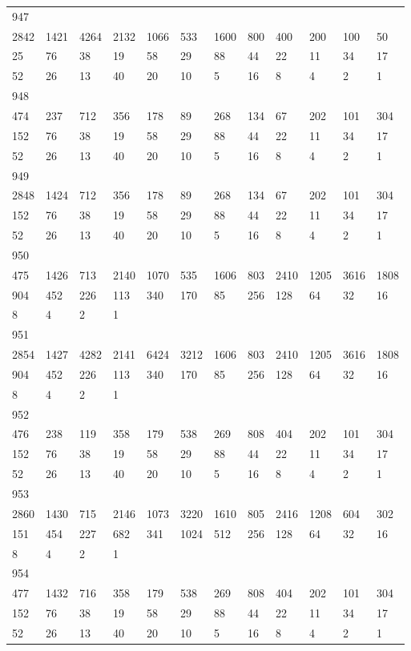 \begin{longtable}{llllllllllll}
947&&&&&&&&&&&\\
2842& 1421& 4264& 2132& 1066& 533& 1600& 800& 400& 200& 100& 50\\
25& 76& 38& 19& 58& 29& 88& 44& 22& 11& 34& 17\\
52& 26& 13& 40& 20& 10& 5& 16& 8& 4& 2& 1\\

948&&&&&&&&&&&\\
474& 237& 712& 356& 178& 89& 268& 134& 67& 202& 101& 304\\
152& 76& 38& 19& 58& 29& 88& 44& 22& 11& 34& 17\\
52& 26& 13& 40& 20& 10& 5& 16& 8& 4& 2& 1\\

949&&&&&&&&&&&\\
2848& 1424& 712& 356& 178& 89& 268& 134& 67& 202& 101& 304\\
152& 76& 38& 19& 58& 29& 88& 44& 22& 11& 34& 17\\
52& 26& 13& 40& 20& 10& 5& 16& 8& 4& 2& 1\\

950&&&&&&&&&&&\\
475& 1426& 713& 2140& 1070& 535& 1606& 803& 2410& 1205& 3616& 1808\\
904& 452& 226& 113& 340& 170& 85& 256& 128& 64& 32& 16\\
8& 4& 2& 1& \\

951&&&&&&&&&&&\\
2854& 1427& 4282& 2141& 6424& 3212& 1606& 803& 2410& 1205& 3616& 1808\\
904& 452& 226& 113& 340& 170& 85& 256& 128& 64& 32& 16\\
8& 4& 2& 1& \\

952&&&&&&&&&&&\\
476& 238& 119& 358& 179& 538& 269& 808& 404& 202& 101& 304\\
152& 76& 38& 19& 58& 29& 88& 44& 22& 11& 34& 17\\
52& 26& 13& 40& 20& 10& 5& 16& 8& 4& 2& 1\\

953&&&&&&&&&&&\\
2860& 1430& 715& 2146& 1073& 3220& 1610& 805& 2416& 1208& 604& 302\\
151& 454& 227& 682& 341& 1024& 512& 256& 128& 64& 32& 16\\
8& 4& 2& 1& \\

954&&&&&&&&&&&\\
477& 1432& 716& 358& 179& 538& 269& 808& 404& 202& 101& 304\\
152& 76& 38& 19& 58& 29& 88& 44& 22& 11& 34& 17\\
52& 26& 13& 40& 20& 10& 5& 16& 8& 4& 2& 1\\


\end{longtable}
